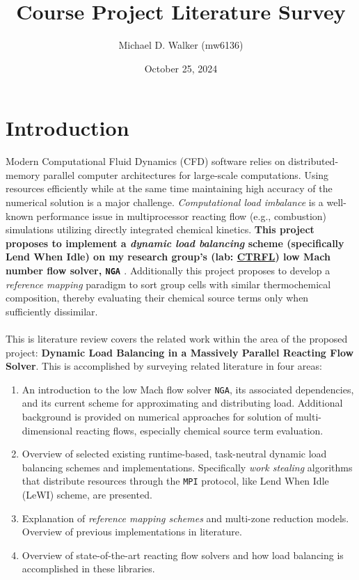 \documentclass{homework}
\author{Michael D. Walker (mw6136)}
\date{October 25, 2024}
\title{Course Project Literature Survey}
\begin{document}
 \maketitle
\section{\textbf{Introduction}}
\noindent Modern Computational Fluid Dynamics (CFD) software relies on distributed-memory parallel computer architectures for large-scale computations. Using resources efficiently while at the same time maintaining high accuracy of the numerical solution is a major challenge. \emph{Computational load imbalance} is a well-known performance issue in multiprocessor reacting flow (e.g., combustion) simulations utilizing directly integrated chemical kinetics. \noindent \textbf{This project proposes to implement a \emph{dynamic load balancing} scheme (specifically Lend When Idle) on my research group's (lab: \href{https://ctrfl.princeton.edu/}{CTRFL}) low Mach number flow solver, \texttt{NGA} \cite{DESJARDINS2008,MACART2016}}. Additionally this project proposes to develop a \emph{reference mapping} paradigm to sort group cells with similar thermochemical composition, thereby evaluating their chemical source terms only when sufficiently dissimilar.
\\ \\
\noindent This is literature review covers the related work within the area of the proposed project: \textbf{Dynamic Load Balancing in a Massively Parallel Reacting Flow Solver}. This is accomplished by surveying related literature in four areas:
\begin{enumerate}
    \item An introduction to the low Mach flow solver \texttt{NGA}, its associated dependencies, and its current scheme for approximating and distributing load. Additional background is provided on numerical approaches for solution of multi-dimensional reacting flows, especially chemical source term evaluation.
    \item Overview of selected existing runtime-based, task-neutral dynamic load balancing schemes and implementations. Specifically \emph{work stealing} algorithms that distribute resources through the \texttt{MPI} protocol, like Lend When Idle (LeWI) scheme, are presented.
    \item Explanation of \emph{reference mapping schemes} and multi-zone reduction models. Overview of previous implementations in literature.
    \item Overview of state-of-the-art reacting flow solvers and how load balancing is accomplished in these libraries.
\end{enumerate}
\end{document}
